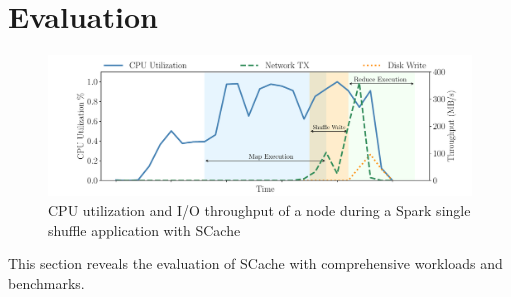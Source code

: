 \section{Evaluation}\label{evaluation}
\begin{figure}
	\includegraphics[width=\linewidth]{fig/scache_util}
	\caption{CPU utilization and I/O throughput of a node during a Spark single shuffle application with SCache}
	\label{fig:scache_util}
	\vspace{-1em}
\end{figure}
This section reveals the evaluation of SCache with comprehensive workloads and benchmarks. 
 \cite{spark-tera}  
